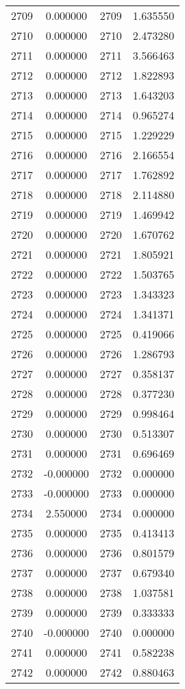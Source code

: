 \documentclass[12pt]{article}
\begin{document}
\begin{longtable}{@{}cccc@{}}
2709 & 0.000000 & 2709 & 1.635550 \\
2710 & 0.000000 & 2710 & 2.473280 \\
2711 & 0.000000 & 2711 & 3.566463 \\
2712 & 0.000000 & 2712 & 1.822893 \\
2713 & 0.000000 & 2713 & 1.643203 \\
2714 & 0.000000 & 2714 & 0.965274 \\
2715 & 0.000000 & 2715 & 1.229229 \\
2716 & 0.000000 & 2716 & 2.166554 \\
2717 & 0.000000 & 2717 & 1.762892 \\
2718 & 0.000000 & 2718 & 2.114880 \\
2719 & 0.000000 & 2719 & 1.469942 \\
2720 & 0.000000 & 2720 & 1.670762 \\
2721 & 0.000000 & 2721 & 1.805921 \\
2722 & 0.000000 & 2722 & 1.503765 \\
2723 & 0.000000 & 2723 & 1.343323 \\
2724 & 0.000000 & 2724 & 1.341371 \\
2725 & 0.000000 & 2725 & 0.419066 \\
2726 & 0.000000 & 2726 & 1.286793 \\
2727 & 0.000000 & 2727 & 0.358137 \\
2728 & 0.000000 & 2728 & 0.377230 \\
2729 & 0.000000 & 2729 & 0.998464 \\
2730 & 0.000000 & 2730 & 0.513307 \\
2731 & 0.000000 & 2731 & 0.696469 \\
2732 & -0.000000 & 2732 & 0.000000 \\
2733 & -0.000000 & 2733 & 0.000000 \\
2734 & 2.550000 & 2734 & 0.000000 \\
2735 & 0.000000 & 2735 & 0.413413 \\
2736 & 0.000000 & 2736 & 0.801579 \\
2737 & 0.000000 & 2737 & 0.679340 \\
2738 & 0.000000 & 2738 & 1.037581 \\
2739 & 0.000000 & 2739 & 0.333333 \\
2740 & -0.000000 & 2740 & 0.000000 \\
2741 & 0.000000 & 2741 & 0.582238 \\
2742 & 0.000000 & 2742 & 0.880463 \\

\end{longtable}
\end{document}
